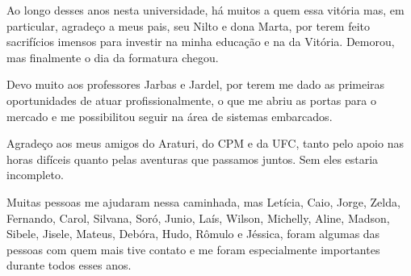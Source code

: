 Ao longo desses anos nesta universidade, há muitos a quem essa vitória mas, em particular, agradeço a meus pais, seu Nilto e dona Marta, por terem feito sacrifícios imensos para investir na minha educação e na da Vitória. Demorou, mas finalmente o dia da formatura chegou. 

Devo muito aos professores Jarbas e Jardel, por terem me dado as primeiras oportunidades de atuar profissionalmente, o que me abriu as portas para o mercado e me possibilitou seguir na área de sistemas embarcados.

Agradeço aos meus amigos do Araturi, do CPM e da UFC, tanto pelo apoio nas horas difíceis quanto pelas aventuras que passamos juntos. Sem eles estaria incompleto. 

Muitas pessoas me ajudaram nessa caminhada, mas Letícia, Caio, Jorge, Zelda, Fernando, Carol, Silvana, Soró, Junio, Laís, Wilson, Michelly, Aline, Madson, Sibele, Jisele, Mateus, Debóra, Hudo, Rômulo e Jéssica, foram algumas das pessoas com quem mais tive contato e me foram especialmente importantes durante todos esses anos. 



















